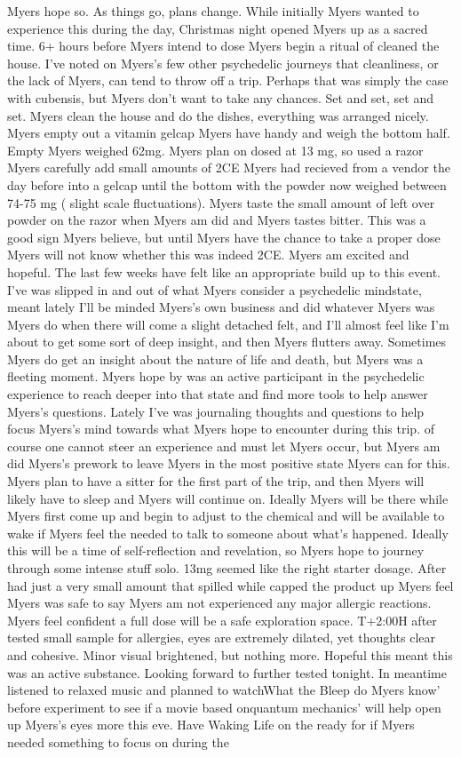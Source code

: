 \documentclass[12pt]{book}
\begin{document}
Myers hope so. As things go, plans change. While initially Myers wanted to experience this during the day, Christmas night opened Myers up as a sacred time. 6+ hours before Myers intend to dose Myers begin a ritual of cleaned the house. I've noted on Myers's few other psychedelic journeys that cleanliness, or the lack of Myers, can tend to throw off a trip. Perhaps that was simply the case with cubensis, but Myers don't want to take any chances. Set and set, set and set. Myers clean the house and do the dishes, everything was arranged nicely. Myers empty out a vitamin gelcap Myers have handy and weigh the bottom half. Empty Myers weighed 62mg. Myers plan on dosed at 13 mg, so used a razor Myers carefully add small amounts of 2CE Myers had recieved from a vendor the day before into a gelcap until the bottom with the powder now weighed between 74-75 mg ( slight scale fluctuations). Myers taste the small amount of left over powder on the razor when Myers am did and Myers tastes bitter. This was a good sign Myers believe, but until Myers have the chance to take a proper dose Myers will not know whether this was indeed 2CE. Myers am excited and hopeful. The last few weeks have felt like an appropriate build up to this event. I've was slipped in and out of what Myers consider a psychedelic mindstate, meant lately I'll be minded Myers's own business and did whatever Myers was Myers do when there will come a slight detached felt, and I'll almost feel like I'm about to get some sort of deep insight, and then Myers flutters away. Sometimes Myers do get an insight about the nature of life and death, but Myers was a fleeting moment. Myers hope by was an active participant in the psychedelic experience to reach deeper into that state and find more tools to help answer Myers's questions. Lately I've was journaling thoughts and questions to help focus Myers's mind towards what Myers hope to encounter during this trip. of course one cannot steer an experience and must let Myers occur, but Myers am did Myers's prework to leave Myers in the most positive state Myers can for this. Myers plan to have a sitter for the first part of the trip, and then Myers will likely have to sleep and Myers will continue on. Ideally Myers will be there while Myers first come up and begin to adjust to the chemical and will be available to wake if Myers feel the needed to talk to someone about what's happened. Ideally this will be a time of self-reflection and revelation, so Myers hope to journey through some intense stuff solo. 13mg seemed like the right starter dosage. After had just a very small amount that spilled while capped the product up Myers feel Myers was safe to say Myers am not experienced any major allergic reactions. Myers feel confident a full dose will be a safe exploration space. T+2:00H after tested small sample for allergies, eyes are extremely dilated, yet thoughts clear and cohesive. Minor visual brightened, but nothing more. Hopeful this meant this was an active substance. Looking forward to further tested tonight. In meantime listened to relaxed music and planned to watchWhat the Bleep do Myers know' before experiment to see if a movie based onquantum mechanics' will help open up Myers's eyes more this eve. Have Waking Life on the ready for if Myers needed something to focus on during the 
\end{document}
